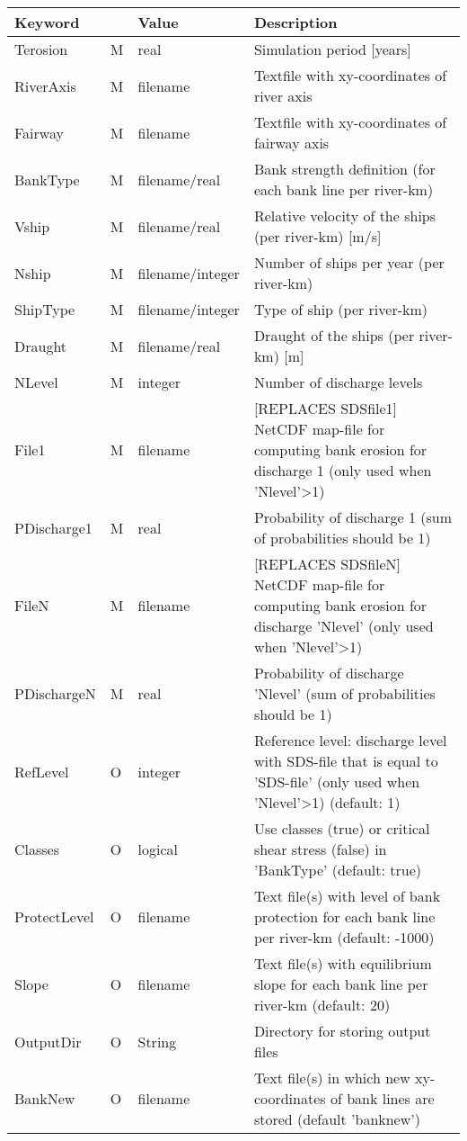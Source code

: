 \begin{tabular}{llll}
Keyword &  & Value & Description \\ \hline
Terosion & M & real & Simulation period  [years] \\
RiverAxis & M & filename & Textfile with xy-coordinates of river axis \\
Fairway  & M & filename & Textfile with xy-coordinates of fairway axis \\
BankType & M & filename/real & Bank strength definition (for each bank line per river-km) \\
Vship  & M & filename/real & Relative velocity of the ships (per river-km) [m/s] \\
Nship  & M & filename/integer & Number of ships per year (per river-km) \\
ShipType & M & filename/integer & Type of ship (per river-km) \\
Draught & M & filename/real & Draught of the ships (per river-km) [m] \\
NLevel & M & integer & Number of discharge levels \\
File1 & M & filename & [REPLACES SDSfile1] NetCDF map-file for computing bank erosion for discharge 1 (only used when 'Nlevel'>1) \\
PDischarge1 & M & real & Probability of discharge 1 (sum of probabilities should be 1) \\
FileN & M & filename & [REPLACES SDSfileN] NetCDF map-file for computing bank erosion for discharge 'Nlevel' (only used when 'Nlevel'>1) \\
PDischargeN & M & real & Probability of discharge 'Nlevel' (sum of probabilities should be 1) \\
RefLevel & O & integer & Reference level: discharge level with SDS-file that is equal to 'SDS-file' (only used when 'Nlevel'>1)  (default: 1) \\
Classes & O & logical & Use classes (true) or critical shear stress (false) in 'BankType' (default: true) \\
ProtectLevel & O & filename & Text file(s) with level of bank protection for each bank line per river-km (default: -1000) \\
Slope & O & filename & Text file(s) with equilibrium slope for each bank line per river-km  (default: 20) \\
OutputDir & O & String & Directory for storing output files \\
BankNew & O & filename & Text file(s) in which new xy-coordinates of bank lines are stored (default 'banknew') \\

\end{tabular}
